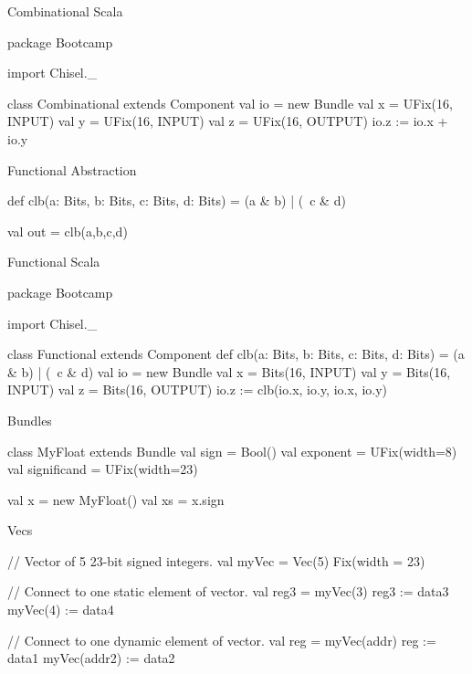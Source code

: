 \documentclass[xcolor=pdflatex,dvipsnames,table]{beamer}
\begin{document}
\begin{frame}[fragile]{Combinational Scala}
\begin{scala}
package Bootcamp {

import Chisel._

class Combinational extends Component {
  val io = new Bundle {
    val x = UFix(16, INPUT)
    val y = UFix(16, INPUT)
    val z = UFix(16, OUTPUT)
  }
  io.z := io.x + io.y
}

}
\end{scala}
\end{frame}

\begin{frame}[fragile]{Functional Abstraction}
\begin{scala}
def clb(a: Bits, b: Bits, c: Bits, d: Bits) = 
  (a & b) | (~c & d)

val out = clb(a,b,c,d)
\end{scala}
\end{frame}

\begin{frame}{Functional Scala}
\begin{scala}
package Bootcamp {

import Chisel._

class Functional extends Component {
  def clb(a: Bits, b: Bits, c: Bits, d: Bits) = 
    (a & b) | (~c & d)
  val io = new Bundle {
    val x = Bits(16, INPUT)
    val y = Bits(16, INPUT)
    val z = Bits(16, OUTPUT)
  }
  io.z := clb(io.x, io.y, io.x, io.y)
}

}
\end{scala}
\end{frame}

\begin{frame}[fragile]{Bundles}
\begin{scala}
class MyFloat extends Bundle{
  val sign        = Bool()
  val exponent    = UFix(width=8)
  val significand = UFix(width=23)
}

val x  = new MyFloat()
val xs = x.sign
\end{scala}
\end{frame}

\begin{frame}[fragile]{Vecs}
\begin{scala}
// Vector of 5 23-bit signed integers.
val myVec = Vec(5) { Fix(width = 23) } 

// Connect to one static element of vector.
val reg3  = myVec(3)                   
reg3     := data3 
myVec(4) := data4

// Connect to one dynamic element of vector.
val reg       = myVec(addr)
reg          := data1
myVec(addr2) := data2
\end{scala}
\end{frame}
\end{document}
